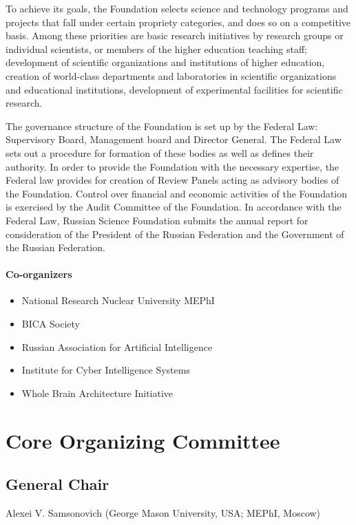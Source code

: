 \documentclass[10pt,fleqn,openany]{book} %
\begin{document}
To achieve its goals, the Foundation selects science and technology programs and projects that fall under certain propriety categories, and does so on a competitive basis. Among these priorities are basic research initiatives by research groups or individual scientists, or members of the higher education teaching staff; development of scientific organizations and institutions of higher education, creation of world-class departments and laboratories in scientific organizations and educational institutions, development of experimental facilities for scientific research.

The governance structure of the Foundation is set up by the Federal Law: Supervisory Board, Management board and Director General. The Federal Law sets out a  procedure for formation of these bodies as well as defines their authority. In order to provide the Foundation with the necessary expertise, the Federal law provides for creation of Review Panels acting as advisory bodies of the Foundation. Control over financial and economic activities of the Foundation is exercised by the Audit Committee of the Foundation. In accordance with the Federal Law, Russian Science Foundation submits the annual report for consideration of the President of the Russian Federation and the Government of the Russian Federation.

\vfill

\paragraph{Co-organizers}
	\begin{itemize}
		\item National Research Nuclear University MEPhI
		\item BICA Society
		\item Russian Association for Artificial Intelligence
		\item Institute for Cyber Intelligence Systems
		\item Whole Brain Architecture Initiative
	\end{itemize}

\section{Core Organizing Committee}

\subsection{General Chair}
	Alexei V. Samsonovich (George Mason University, USA; MEPhI, Moscow)
\end{document}
